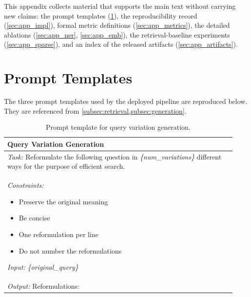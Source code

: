 \documentclass[11pt]{article}
\begin{document}
% 

\clearpage
\appendix
This appendix collects material that supports the main text without carrying new claims: the prompt templates (\ref{sec:appendix_prompts}), the reproducibility record (\ref{sec:app_impl}), formal metric definitions (\ref{sec:app_metrics}), the detailed ablations (\ref{sec:app_ner}, \ref{sec:app_emb}), the retrieval-baseline experiments (\ref{sec:app_sparse}), and an index of the released artifacts (\ref{sec:app_artifacts}).

\section{Prompt Templates}
\label{sec:appendix_prompts}
The three prompt templates used by the deployed pipeline are reproduced below.
They are referenced from \cref{subsec:retrieval,subsec:generation}.

\begin{table}[t]
    \centering
    \footnotesize
    \caption{Prompt template for query variation generation.}
    \label{tab:prompt_query_variation}
    {\ttfamily %
    \begin{tabular}{p{0.93\linewidth}}
        \hline
        \textbf{Query Variation Generation} \\
        \hline
        \textit{Task:} Reformulate the following question in \textit{\{num\_variations\}} different ways for the purpose of efficient search.\\
        \textit{Constraints:}
        \begin{itemize}[leftmargin=*,noitemsep,topsep=2pt]
            \item Preserve the original meaning
            \item Be concise
            \item One reformulation per line
            \item Do not number the reformulations
        \end{itemize}
        \textit{Input:} \textit{\{original\_query\}}\\
        \textit{Output:} Reformulations:\\
        \hline
    \end{tabular}
    } %
\end{table}
\end{document}
